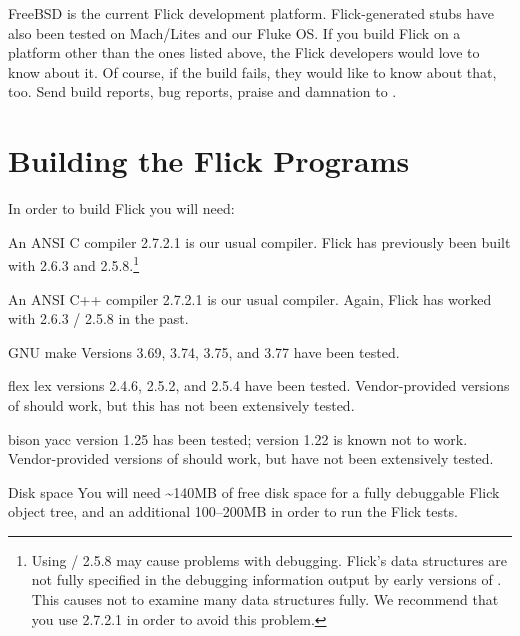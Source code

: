 FreeBSD is the current Flick development platform.  Flick-generated stubs have
also been tested on Mach/Lites and our Fluke OS\@.  If you build Flick on a
platform other than the ones listed above, the Flick developers would love to
know about it.  Of course, if the build fails, they would like to know about
that, too.  Send build reports, bug reports, praise and damnation to
\flickbugsemail.



\section{Building the Flick Programs}
\label{sec:Building the Flick Programs}

In order to build Flick you will need:

\begin{commandlist}
  \item[\textrm{An ANSI C compiler}]
   2.7.2.1 is our usual compiler.  Flick has previously been built
  with  2.6.3 and 2.5.8.\footnote{Using
  / 2.5.8 may cause problems with debugging.  Flick's
  data structures are not fully specified in the debugging information output
  by early versions of .  This causes  not to examine
  many data structures fully.  We recommend that you use  2.7.2.1
  in order to avoid this problem.}

  \item[\textrm{An ANSI C++ compiler}]
   2.7.2.1 is our usual compiler.  Again, Flick has worked with
   2.6.3 / 2.5.8 in the past.

  \item[\textrm{GNU} make]
  Versions 3.69, 3.74, 3.75, and 3.77 have been tested.

  \item[flex \orcommand{} lex]
   versions 2.4.6, 2.5.2, and 2.5.4 have been tested.
  Vendor-provided versions of  should work, but this has not been
  extensively tested.

  \item[bison \orcommand{} yacc]
   version 1.25 has been tested; version 1.22 is known not to
  work.   Vendor-provided versions of  should work, but have not
  been extensively tested.

  \item[\textrm{Disk space}]
  You will need \~{}140MB of free disk space for a fully debuggable Flick
  object tree, and an additional 100--200MB in order to run the Flick tests.
\end{commandlist}


